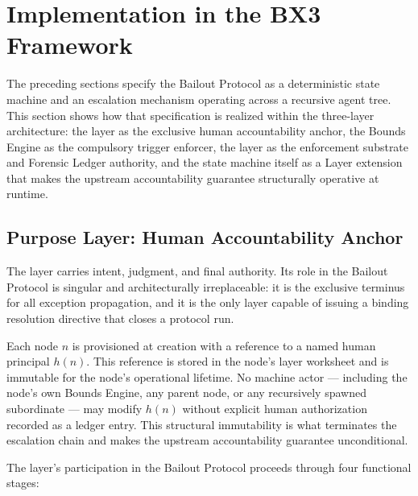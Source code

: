 \section{Implementation in the BX3 Framework}\label{sec:implementation}

The preceding sections specify the Bailout Protocol as a deterministic state machine and an escalation mechanism operating across a recursive agent tree. This section shows how that specification is realized within the \bxthree{} three-layer architecture: the \purpose{} layer as the exclusive human accountability anchor, the Bounds Engine as the compulsory trigger enforcer, the \fact{} layer as the enforcement substrate and Forensic Ledger authority, and the state machine itself as a \fact{} Layer extension that makes the upstream accountability guarantee structurally operative at runtime.

\subsection{Purpose Layer: Human Accountability Anchor}
\label{sec:purpose-layer}

The \purpose{} layer carries intent, judgment, and final authority. Its role in the Bailout Protocol is singular and architecturally irreplaceable: it is the exclusive terminus for all exception propagation, and it is the only layer capable of issuing a binding resolution directive that closes a protocol run.

Each \bxthree{} node $n$ is provisioned at creation with a reference to a named human principal $h(n)$. This reference is stored in the node's \purpose{} layer worksheet and is immutable for the node's operational lifetime. No machine actor — including the node's own Bounds Engine, any parent node, or any recursively spawned subordinate — may modify $h(n)$ without explicit human authorization recorded as a ledger entry. This structural immutability is what terminates the escalation chain and makes the upstream accountability guarantee unconditional.

The \purpose{} layer's participation in the Bailout Protocol proceeds through four functional stages:

